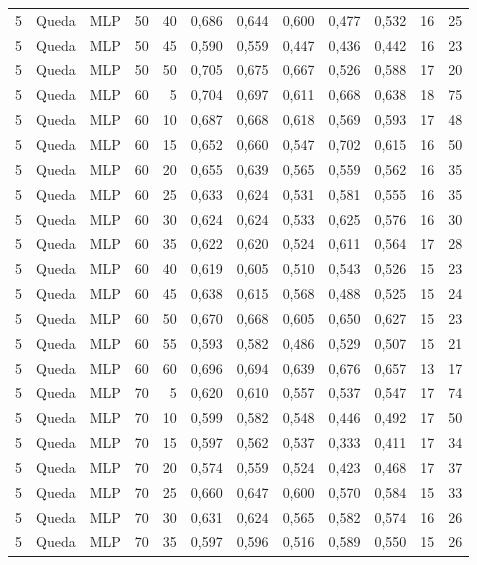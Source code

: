 \begin{longtable}{@{}rllrrrrrrrrr@{}}
5 & Queda & MLP & 50 & 40 & 0,686 & 0,644 & 0,600 & 0,477 & 0,532 & 16 & 25 \\
5 & Queda & MLP & 50 & 45 & 0,590 & 0,559 & 0,447 & 0,436 & 0,442 & 16 & 23 \\
5 & Queda & MLP & 50 & 50 & 0,705 & 0,675 & 0,667 & 0,526 & 0,588 & 17 & 20 \\
5 & Queda & MLP & 60 & 5 & 0,704 & 0,697 & 0,611 & 0,668 & 0,638 & 18 & 75 \\
5 & Queda & MLP & 60 & 10 & 0,687 & 0,668 & 0,618 & 0,569 & 0,593 & 17 & 48 \\
5 & Queda & MLP & 60 & 15 & 0,652 & 0,660 & 0,547 & 0,702 & 0,615 & 16 & 50 \\
5 & Queda & MLP & 60 & 20 & 0,655 & 0,639 & 0,565 & 0,559 & 0,562 & 16 & 35 \\
5 & Queda & MLP & 60 & 25 & 0,633 & 0,624 & 0,531 & 0,581 & 0,555 & 16 & 35 \\
5 & Queda & MLP & 60 & 30 & 0,624 & 0,624 & 0,533 & 0,625 & 0,576 & 16 & 30 \\
5 & Queda & MLP & 60 & 35 & 0,622 & 0,620 & 0,524 & 0,611 & 0,564 & 17 & 28 \\
5 & Queda & MLP & 60 & 40 & 0,619 & 0,605 & 0,510 & 0,543 & 0,526 & 15 & 23 \\
5 & Queda & MLP & 60 & 45 & 0,638 & 0,615 & 0,568 & 0,488 & 0,525 & 15 & 24 \\
5 & Queda & MLP & 60 & 50 & 0,670 & 0,668 & 0,605 & 0,650 & 0,627 & 15 & 23 \\
5 & Queda & MLP & 60 & 55 & 0,593 & 0,582 & 0,486 & 0,529 & 0,507 & 15 & 21 \\
5 & Queda & MLP & 60 & 60 & 0,696 & 0,694 & 0,639 & 0,676 & 0,657 & 13 & 17 \\
5 & Queda & MLP & 70 & 5 & 0,620 & 0,610 & 0,557 & 0,537 & 0,547 & 17 & 74 \\
5 & Queda & MLP & 70 & 10 & 0,599 & 0,582 & 0,548 & 0,446 & 0,492 & 17 & 50 \\
5 & Queda & MLP & 70 & 15 & 0,597 & 0,562 & 0,537 & 0,333 & 0,411 & 17 & 34 \\
5 & Queda & MLP & 70 & 20 & 0,574 & 0,559 & 0,524 & 0,423 & 0,468 & 17 & 37 \\
5 & Queda & MLP & 70 & 25 & 0,660 & 0,647 & 0,600 & 0,570 & 0,584 & 15 & 33 \\
5 & Queda & MLP & 70 & 30 & 0,631 & 0,624 & 0,565 & 0,582 & 0,574 & 16 & 26 \\
5 & Queda & MLP & 70 & 35 & 0,597 & 0,596 & 0,516 & 0,589 & 0,550 & 15 & 26 \\

\end{longtable}
